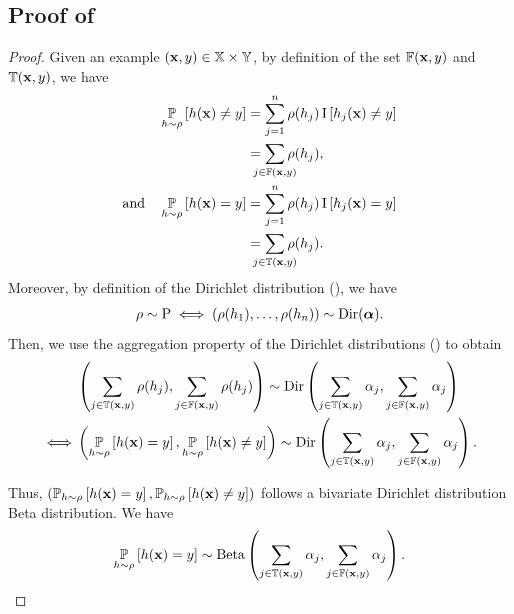 \begin{noaddcontents}
\section{Proof of }
\label{chap:mv-sto:sec:proof-lemma-risk}

\lemmarisk*
\begin{proof}
Given an example $(\mathbf{x},y)\in\mathbb{X}\times\mathbb{Y}$, by definition of the set $\mathbb{F}(\mathbf{x}, y)$ and $\mathbb{T}(\mathbf{x}, y)$, we have
\begin{align*}
    \PP_{\h\sim\Q}\LB \h(\x) \neq \y\RB &= \sum_{j=1}^{\n} \Q(\h_{j})\indic\LB \h_j(\x) \neq \y\RB\\
    &= \sum_{\mathclap{j\in \Fbb(\x, \y)}} \Q(\h_{j}),\\
    \text{and}\quad \PP_{\h\sim\Q}\LB \h(\x) = \y\RB &= \sum_{j=1}^{\n} \Q(\h_{j})\indic\LB \h_j(\x) = \y\RB\\
    &= \sum_{\mathclap{j\in \Tbb(\x, \y)}} \Q(\h_{j}).
\end{align*}
Moreover, by definition of the Dirichlet distribution (), we have
\begin{align*}
    \rho\sim\mathrm{P} \iff (\rho(h_1),\dots,\rho(h_n)) \sim\textrm{Dir}(\boldsymbol{\alpha}).
\end{align*}
Then, we use the aggregation property of the Dirichlet distributions () to obtain
\begin{align*}
    &\left(\sum_{j\in \mathbb{T}(\mathbf{x}, y)}\rho(h_{j}), \sum_{j\in \mathbb{F}(\mathbf{x}, y)}\rho(h_{j})\right) \sim \textrm{Dir}\left( \sum_{j\in \mathbb{T}(\mathbf{x}, y)}\alpha_{j}, \sum_{j\in \mathbb{F}(\mathbf{x}, y)}\alpha_{j}\right)\\
    \iff &\left( \operatorname*{\mathbb{P}}_{h\sim\rho}\left[ h(\mathbf{x}) = y\right], \operatorname*{\mathbb{P}}_{h\sim\rho}\left[ h(\mathbf{x}) \neq y\right]\right) \sim \textrm{Dir}\left( \sum_{j\in \mathbb{T}(\mathbf{x}, y)}\alpha_{j}, \sum_{j\in \mathbb{F}(\mathbf{x}, y)}\alpha_{j}\right).
\end{align*}

Thus, $\left( \operatorname*{\mathbb{P}}_{h\sim\rho}\left[ h(\mathbf{x}) = y\right], \operatorname*{\mathbb{P}}_{h\sim\rho}\left[ h(\mathbf{x}) \neq y\right]\right)$ follows a bivariate Dirichlet distribution \aka Beta distribution. 
We have
\begin{align*}
    \operatorname*{\mathbb{P}}_{h\sim\rho}\left[ h(\mathbf{x}) = y\right] \sim \textrm{Beta}\left(\sum_{j\in \mathbb{T}(\mathbf{x}, y)}\alpha_{j}, \sum_{j\in \mathbb{F}(\mathbf{x}, y)}\alpha_{j}\right).
\end{align*}



\end{proof}
\end{noaddcontents}
